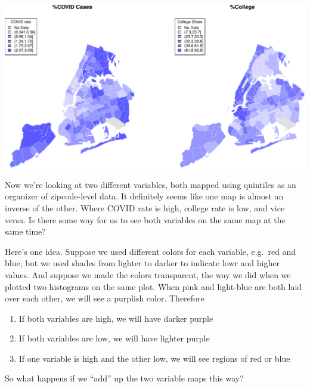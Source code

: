 \documentclass[openany]{book}
\providecommand{\tightlist}{%
  \setlength{\itemsep}{0pt}\setlength{\parskip}{0pt}}
\begin{document}
\begin{center}\includegraphics[width=0.9\linewidth]{figs/unnamed-chunk-95-1} \end{center}

Now we're looking at two different variables, both mapped using quintiles as an organizer of zipcode-level data. It definitely seems like one map is almost an inverse of the other. Where COVID rate is high, college rate is low, and vice versa. Is there some way for us to see both variables on the same map at the same time?

Here's one idea. Suppose we used different colors for each variable, e.g.~red and blue, but we used shades from lighter to darker to indicate lowr and higher values. And suppose we made the colors transparent, the way we did when we plotted two histograms on the same plot. When pink and light-blue are both laid over each other, we will see a purplish color. Therefore

\begin{enumerate}
\def\labelenumi{\arabic{enumi}.}
\tightlist
\item
  If both variables are high, we will have darker purple
\item
  If both variables are low, we will have lighter purple
\item
  If one variable is high and the other low, we will see regions of red or blue
\end{enumerate}

So what happens if we ``add'' up the two variable maps this way?
\end{document}
